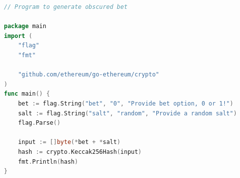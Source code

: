 \documentclass[12pt,a4paper]{article}
\begin{document}
\begin{lstlisting}[language=go]
// Program to generate obscured bet

package main
import (
	"flag"
	"fmt"

	"github.com/ethereum/go-ethereum/crypto"
)
func main() {
	bet := flag.String("bet", "0", "Provide bet option, 0 or 1!")
	salt := flag.String("salt", "random", "Provide a random salt")
	flag.Parse()

	input := []byte(*bet + *salt)
	hash := crypto.Keccak256Hash(input)
	fmt.Println(hash)
}

\end{lstlisting}
\end{document}
